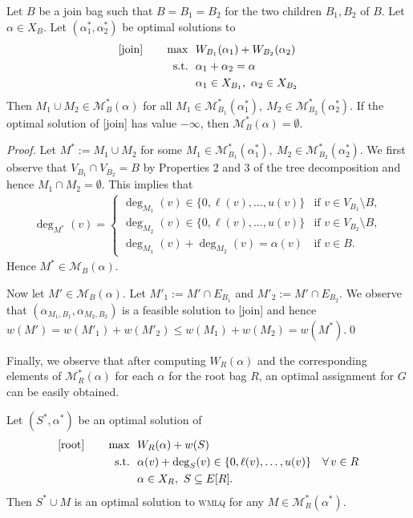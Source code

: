 \documentclass{llncs}
\begin{document}
\begin{lemma}\label{lem:join}
	Let $B$ be a join bag such that $B = B_1 = B_2$ for the two children $B_1, B_2$ of $B$.
	Let $\alpha \in X_B$. Let $(\alpha_1^*, \alpha_2^*)$ be optimal solutions to
	\begin{align*}
		\textup{[join]}\qquad\max \ \ & W_{B_1}(\alpha_1) + W_{B_2}(\alpha_2)\\
		\textup{s.t.} \ \ & \alpha_1 + \alpha_2 = \alpha\\
		& \alpha_1 \in X_{B_1},\ \alpha_2 \in X_{B_2}
	\end{align*}
	Then $M_1 \cup M_2 \in \mathcal{M}^*_B(\alpha)$ for all $M_1 \in \mathcal{M}^*_{B_1}(\alpha_1^*),\ M_2 \in \mathcal{M}^*_{B_2}(\alpha_2^*)$.
	If the optimal solution of [join] has value $-\infty$, then $\mathcal{M}^*_B(\alpha) = \emptyset$.
\end{lemma}
\begin{proof}
  Let $M^* := M_1 \cup M_2$ for some $M_1 \in \mathcal{M}^*_{B_1}(\alpha_1^*),\ M_2 \in \mathcal{M}^*_{B_2}(\alpha_2^*)$. We first observe that $V_{B_1} \cap V_{B_2} = B$ by Properties 2 and 3
  of the tree decomposition and hence $M_1 \cap M_2 = \emptyset$. This implies that
  \begin{align*}
   \deg_{M^*}(v) = \begin{cases}
   \deg_{M_1}(v) \in \{0, \ell(v), \dots, u(v)\} & \text{if } v \in V_{B_1} \setminus B,\\
   \deg_{M_2}(v) \in \{0, \ell(v), \dots, u(v)\} & \text{if } v \in V_{B_2} \setminus B,\\
   \deg_{M_1}(v) + \deg_{M_2}(v) = \alpha(v) & \text{if } v \in B.
   \end{cases}
   \end{align*}
  Hence $M^* \in \mathcal{M}_B(\alpha)$.
   
  Now let $M' \in \mathcal{M}_B(\alpha)$. Let $M'_1 := M' \cap E_{B_1}$ and $M'_2 := M' \cap E_{B_2}$. We observe that $(\alpha_{M_1, B_1}, \alpha_{M_2, B_2})$ is a feasible solution to [join] and hence
   $w(M') = w(M'_1) + w(M'_2) \leq w(M_1) + w(M_2) = w(M^*)$.\qed
\end{proof}

Finally, we observe that after computing $W_R(\alpha)$ and the corresponding elements of $\mathcal{M}^*_R(\alpha)$ for each $\alpha$ for the root bag $R$, an optimal assignment for $G$ can be easily obtained.
\begin{lemma}\label{lem:root}
  Let $(S^*, \alpha^*)$ be an optimal solution of
  \begin{align*}
 \textup{[root]}\qquad \max\ \ & W_R(\alpha) + w(S) \\
 \textup{s.t.}\ \ & \alpha(v) + \deg_S(v) \in \{0, \ell(v), \dots, u(v)\} \quad \forall\,v \in R\\
  & \alpha \in X_R,\ S \subseteq E[R].
\end{align*}
  Then $S^* \cup M$ is an optimal solution to \textsc{wmlq} for any $M \in \mathcal{M}^*_R(\alpha^*)$.
\end{lemma}
\end{document}

